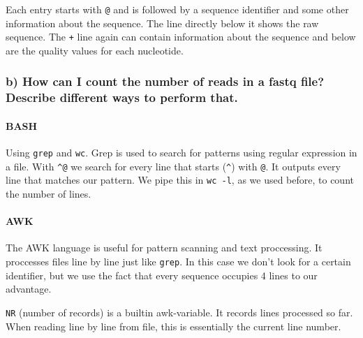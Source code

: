 Each entry starts with \texttt{@} and is followed by a sequence
identifier and some other information about the sequence. The line
directly below it shows the raw sequence. The \texttt{+} line again can
contain information about the sequence and below are the quality values
for each nucleotide.

\hypertarget{b-how-can-i-count-the-number-of-reads-in-a-fastq-file-describe-different-ways-to-perform-that.}{%
\subsubsection{b) How can I count the number of reads in a fastq file?
Describe different ways to perform
that.}\label{b-how-can-i-count-the-number-of-reads-in-a-fastq-file-describe-different-ways-to-perform-that.}}

\hypertarget{bash}{%
\paragraph{BASH}\label{bash}}

Using \texttt{grep} and \texttt{wc}. Grep is used to search for patterns
using regular expression in a file. With
\texttt{\textquotesingle{}\^{}@\textquotesingle{}} we search for every
line that starts (\texttt{\^{}}) with \texttt{@}. It outputs every line
that matches our pattern. We pipe this in \texttt{wc\ -l}, as we used
before, to count the number of lines.

\begin{Shaded}
\begin{Highlighting}[]
  \KeywordTok{|}  
\end{Highlighting}
\end{Shaded}

\hypertarget{awk}{%
\paragraph{AWK}\label{awk}}

The AWK language is useful for pattern scanning and text proccessing. It
proccesses files line by line just like \texttt{grep}. In this case we
don't look for a certain identifier, but we use the fact that every
sequence occupies 4 lines to our advantage.

\texttt{NR} (number of records) is a builtin awk-variable. It records
lines processed so far. When reading line by line from file, this is
essentially the current line number.

